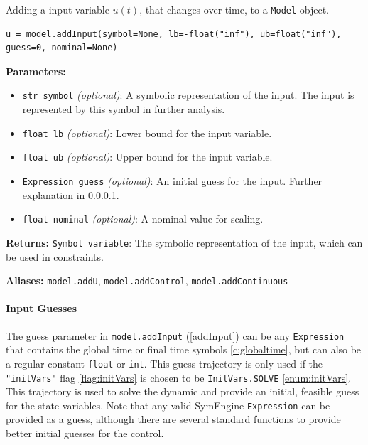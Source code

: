 \documentclass[12pt]{article}
\begin{document}
\begin{mdframed}[backgroundcolor=gray!10, roundcorner=10pt, linewidth=1pt]

	Adding a input variable $u(t)$, that changes over time, to a
	\texttt{Model} object.

	\begin{lstlisting}
u = model.addInput(symbol=None, lb=-float("inf"), ub=float("inf"), guess=0, nominal=None)
	\end{lstlisting}
	\label{addInput}
	\textbf{Parameters:}
	\begin{itemize}
		\item \texttt{str symbol} \emph{(optional)}: A symbolic
		      representation of the input. The input is
		      represented by this symbol in
		      further analysis.
		\item \texttt{float lb} \emph{(optional)}: Lower bound for the
		      input variable.
		\item \texttt{float ub} \emph{(optional)}: Upper bound for the
		      input variable.
		\item \texttt{Expression guess} \emph{(optional)}: An initial
		      guess for the input. Further explanation in
		      \ref{p:cguesses}.
		\item \texttt{float nominal} \emph{(optional)}: A nominal value
		      for scaling.
	\end{itemize}

	\textbf{Returns:}
	\texttt{Symbol variable}: The symbolic representation of the input,
	which can be used in constraints.

	\textbf{Aliases:}  \texttt{model.addU}, \texttt{model.addControl},
	\texttt{model.addContinuous}
\end{mdframed}

\paragraph{Input Guesses}
\label{p:cguesses}
The guess parameter in \texttt{model.addInput} (\ref{addInput}) can be
any \texttt{Expression} that contains the global time or final time symbols
\ref{c:globaltime}, but can also be a regular constant \texttt{float} or
\texttt{int}. This guess trajectory is only used if the
\texttt{"initVars"} flag \ref{flag:initVars} is chosen to be
\texttt{InitVars.SOLVE} \ref{enum:initVars}. This trajectory is used to
solve the dynamic and provide an initial, feasible guess for the state
variables. Note that any valid SymEngine \texttt{Expression} can be provided as
a guess, although there are several standard functions to provide better
initial guesses for the control.
\end{document}

